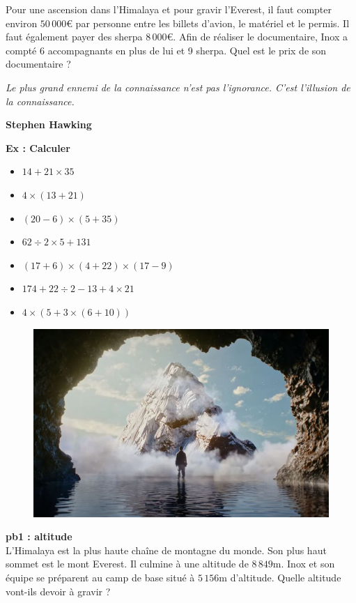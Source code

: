 Pour une ascension dans l’Himalaya et pour gravir l’Everest, il faut compter environ $50\,000$€ par personne entre les billets d'avion, le matériel et le permis. Il faut également payer des sherpa $8\,000$€. Afin de réaliser le documentaire, Inox a compté 6 accompagnants en plus de lui et 9 sherpa. Quel est le prix de son documentaire ?

\newpage

\begin{center}
  \textit{Le plus grand ennemi de la connaissance n'est pas l'ignorance. C'est l'illusion de la connaissance.} 
  
  \textbf{Stephen Hawking}
\end{center}

\textbf{Ex : Calculer} 

\begin{multicols}{2} \begin{itemize}[label={$\bullet$}]
  \item $14 + 21 \times 35$ 
  \item $4 \times (13 + 21)$ 
  \item $(20 - 6) \times (5 + 35)$
  \item $62 \div 2 \times 5 + 131$
  \item $(17 + 6) \times (4 + 22) \times (17 - 9)$
  \item $174 + 22 \div 2 - 13 + 4 \times 21$
  \item $4 \times ( 5 + 3 \times (6 + 10))$
\end{itemize} \end{multicols}


\begin{figure}[H]
  \centering
  \includegraphics[width=0.4\linewidth]{5x1-calcul-numerique/kaizen.jpg}
\end{figure}

\textbf{pb1 : altitude} \\

L'Himalaya est la plus haute chaîne de montagne du monde. Son plus haut sommet est le mont Everest. Il culmine à une altitude de $8\,849$m. Inox et son équipe se préparent au camp de base situé à $5\,156$m d'altitude. Quelle altitude vont-ils devoir à gravir ? \\


